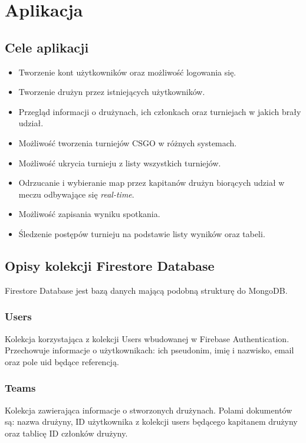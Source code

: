 \documentclass[shortabstract]{iithesis}
\theoremstyle{definition} \newtheorem{definition}{Definicja}[]
\theoremstyle{remark} \newtheorem{remark}[definition]{Observation}
\theoremstyle{plain} \newtheorem{theorem}[definition]{Theorem}
\theoremstyle{plain} \newtheorem{lemma}[definition]{Lemma}
\begin{document}
\chapter{Aplikacja}
\section{Cele aplikacji}

\begin{itemize}
    \item Tworzenie kont użytkowników oraz możliwość logowania się.
    \item Tworzenie drużyn przez istniejących użytkowników.
    \item Przegląd informacji o drużynach, ich członkach oraz turniejach w jakich brały udział.
    \item Możliwość tworzenia turniejów CSGO w różnych systemach.
    \item Możliwość ukrycia turnieju z listy wszystkich turniejów.
    \item Odrzucanie i wybieranie map przez kapitanów drużyn biorących udział w meczu odbywające się \textit{real-time}.
    \item Możliwość zapisania wyniku spotkania.
    \item Śledzenie postępów turnieju na podstawie listy wyników oraz tabeli.
\end{itemize}

\section{Opisy kolekcji Firestore Database}
Firestore Database jest bazą danych mającą podobną strukturę do MongoDB.

\subsection{Users}
Kolekcja korzystająca z kolekcji Users wbudowanej w Firebase Authentication. Przechowuje informacje o użytkownikach: ich pseudonim, imię i nazwisko, email oraz pole uid będące referencją.

\subsection{Teams}
Kolekcja zawierająca informacje o stworzonych drużynach. Polami dokumentów są: nazwa drużyny, ID użytkownika z kolekcji users będącego kapitanem drużyny oraz tablicę ID członków drużyny.
\end{document}
